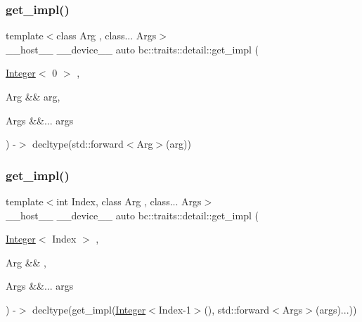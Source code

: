 \subsubsection{\texorpdfstring{get\+\_\+impl()}{get\_impl()}\hspace{0.1cm}{\footnotesize\ttfamily [1/2]}}
{\footnotesize\ttfamily template$<$class Arg , class... Args$>$ \\
\+\_\+\+\_\+host\+\_\+\+\_\+ \+\_\+\+\_\+device\+\_\+\+\_\+ auto bc\+::traits\+::detail\+::get\+\_\+impl (\begin{DoxyParamCaption}\item[{\hyperlink{structbc_1_1traits_1_1Integer}{Integer}$<$ 0 $>$}]{,  }\item[{Arg \&\&}]{arg,  }\item[{Args \&\&...}]{args }\end{DoxyParamCaption}) -\/$>$ decltype(std\+::forward$<$Arg$>$(arg))
\hspace{0.3cm}{\ttfamily [inline]}}

\mbox{\label{namespacebc_1_1traits_1_1detail_a637e145f0095c679f44a1efcba22aa22}} 
\subsubsection{\texorpdfstring{get\+\_\+impl()}{get\_impl()}\hspace{0.1cm}{\footnotesize\ttfamily [2/2]}}
{\footnotesize\ttfamily template$<$int Index, class Arg , class... Args$>$ \\
\+\_\+\+\_\+host\+\_\+\+\_\+ \+\_\+\+\_\+device\+\_\+\+\_\+ auto bc\+::traits\+::detail\+::get\+\_\+impl (\begin{DoxyParamCaption}\item[{\hyperlink{structbc_1_1traits_1_1Integer}{Integer}$<$ Index $>$}]{,  }\item[{Arg \&\&}]{,  }\item[{Args \&\&...}]{args }\end{DoxyParamCaption}) -\/$>$ decltype(get\+\_\+impl(\hyperlink{structbc_1_1traits_1_1Integer}{Integer}$<$Index-\/1$>$(), std\+::forward$<$Args$>$(args)...))
\hspace{0.3cm}{\ttfamily [inline]}}

